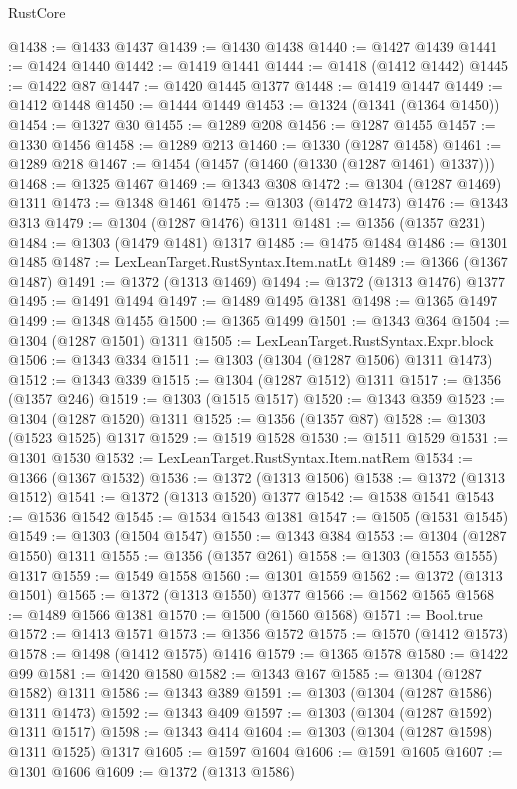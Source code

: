 \begin{lexlean}{RustCore}
\begin{coremodule}
@1438 := @1433 @1437
@1439 := @1430 @1438
@1440 := @1427 @1439
@1441 := @1424 @1440
@1442 := @1419 @1441
@1444 := @1418 (@1412 @1442)
@1445 := @1422 @87
@1447 := @1420 @1445 @1377
@1448 := @1419 @1447
@1449 := @1412 @1448
@1450 := @1444 @1449
@1453 := @1324 (@1341 (@1364 @1450))
@1454 := @1327 @30
@1455 := @1289 @208
@1456 := @1287 @1455
@1457 := @1330 @1456
@1458 := @1289 @213
@1460 := @1330 (@1287 @1458)
@1461 := @1289 @218
@1467 := @1454 (@1457 (@1460 (@1330 (@1287 @1461) @1337)))
@1468 := @1325 @1467
@1469 := @1343 @308
@1472 := @1304 (@1287 @1469) @1311
@1473 := @1348 @1461
@1475 := @1303 (@1472 @1473)
@1476 := @1343 @313
@1479 := @1304 (@1287 @1476) @1311
@1481 := @1356 (@1357 @231)
@1484 := @1303 (@1479 @1481) @1317
@1485 := @1475 @1484
@1486 := @1301 @1485
@1487 := LexLeanTarget.RustSyntax.Item.natLt
@1489 := @1366 (@1367 @1487)
@1491 := @1372 (@1313 @1469)
@1494 := @1372 (@1313 @1476) @1377
@1495 := @1491 @1494
@1497 := @1489 @1495 @1381
@1498 := @1365 @1497
@1499 := @1348 @1455
@1500 := @1365 @1499
@1501 := @1343 @364
@1504 := @1304 (@1287 @1501) @1311
@1505 := LexLeanTarget.RustSyntax.Expr.block
@1506 := @1343 @334
@1511 := @1303 (@1304 (@1287 @1506) @1311 @1473)
@1512 := @1343 @339
@1515 := @1304 (@1287 @1512) @1311
@1517 := @1356 (@1357 @246)
@1519 := @1303 (@1515 @1517)
@1520 := @1343 @359
@1523 := @1304 (@1287 @1520) @1311
@1525 := @1356 (@1357 @87)
@1528 := @1303 (@1523 @1525) @1317
@1529 := @1519 @1528
@1530 := @1511 @1529
@1531 := @1301 @1530
@1532 := LexLeanTarget.RustSyntax.Item.natRem
@1534 := @1366 (@1367 @1532)
@1536 := @1372 (@1313 @1506)
@1538 := @1372 (@1313 @1512)
@1541 := @1372 (@1313 @1520) @1377
@1542 := @1538 @1541
@1543 := @1536 @1542
@1545 := @1534 @1543 @1381
@1547 := @1505 (@1531 @1545)
@1549 := @1303 (@1504 @1547)
@1550 := @1343 @384
@1553 := @1304 (@1287 @1550) @1311
@1555 := @1356 (@1357 @261)
@1558 := @1303 (@1553 @1555) @1317
@1559 := @1549 @1558
@1560 := @1301 @1559
@1562 := @1372 (@1313 @1501)
@1565 := @1372 (@1313 @1550) @1377
@1566 := @1562 @1565
@1568 := @1489 @1566 @1381
@1570 := @1500 (@1560 @1568)
@1571 := Bool.true
@1572 := @1413 @1571
@1573 := @1356 @1572
@1575 := @1570 (@1412 @1573)
@1578 := @1498 (@1412 @1575) @1416
@1579 := @1365 @1578
@1580 := @1422 @99
@1581 := @1420 @1580
@1582 := @1343 @167
@1585 := @1304 (@1287 @1582) @1311
@1586 := @1343 @389
@1591 := @1303 (@1304 (@1287 @1586) @1311 @1473)
@1592 := @1343 @409
@1597 := @1303 (@1304 (@1287 @1592) @1311 @1517)
@1598 := @1343 @414
@1604 := @1303 (@1304 (@1287 @1598) @1311 @1525) @1317
@1605 := @1597 @1604
@1606 := @1591 @1605
@1607 := @1301 @1606
@1609 := @1372 (@1313 @1586)

\end{coremodule}
\end{lexlean}
